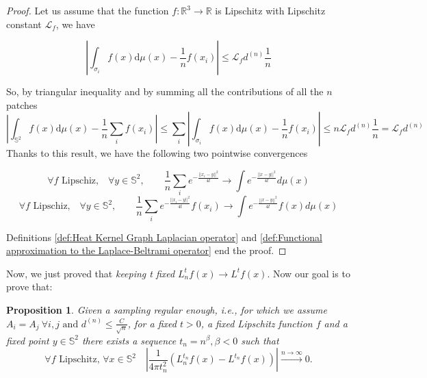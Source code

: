 \documentclass{article} %
\newtheorem{prop}{Proposition}
\begin{document}
\begin{proof}

	Let us assume that the function $f:\mathbb R^3\rightarrow \mathbb R$ is Lipschitz with Lipschitz constant $\mathcal L_f$, we have

	$$\left| \int_{\sigma_{i}}f({ x})\text{d}{\mu(x)} - \frac{1}{n}f( x_i)\right| \leq \mathcal L_fd^{(n)}\frac{1}{n} $$

	So, by triangular inequality and by summing all the contributions of all the $n$ patches
	$$\left| \int_{\mathbb S^2}f({ x})\text{d}{\mu(x)} - \frac{1}{n}\sum_i f( x_i)\right| \leq \sum_i \left| \int_{\sigma_{i}}f({ x})\text{d}{\mu(x)} - \frac{1}{n}f( x_i)\right|\leq n  \mathcal L_fd^{(n)}\frac{1}{n} = \mathcal L_fd^{(n)}$$
	Thanks to this result, we have the following two pointwise convergences

	$$\forall f \text{ Lipschiz,}\quad \forall y\in\mathbb S^2,  \quad\quad \frac{1}{n}\sum_i e^{-\frac{||x_i-y||^2}{4t}}\rightarrow \int e^{-\frac{||x-y||^2}{4t}}d\mu(x)$$
	$$\forall f \text{ Lipschiz,}\quad \forall y\in\mathbb S^2,  \quad\quad \frac{1}{n}\sum_i e^{-\frac{||x_i-y||^2}{4t}}f(x_i)\rightarrow \int e^{-\frac{||x-y||^2}{4t}}f(x)d\mu(x)$$

	Definitions \ref{def:Heat Kernel Graph Laplacian operator} and \ref{def:Functional approximation to the Laplace-Beltrami operator} end the proof.
\end{proof}
\vspace{0.5cm}

Now, we just proved that \textit{keeping t fixed} $L_n^tf(x)\rightarrow L^tf(x)$. Now our goal is to prove that:

\vspace{0.5cm}
\begin{prop}\label{prop:2}
	Given a sampling regular enough, i.e., for which we assume $A_i=A_j \ \forall i,j\text{ and }d^{(n)}\leq \frac{C}{\sqrt{n}}$, for a fixed $t>0$, a fixed Lipschitz function $f$ and a fixed point $y\in\mathbb S^2$ there exists a sequence $t_n = n^\beta, \beta<0$ such that
$$
\forall f \text{ Lipschitz, } \forall x\in\mathbb S^2 \quad \left|\frac{1}{4\pi t_n^2}\left(L_n^{t_n}f(x) - L^{t_n}f(x)\right)\right|\xrightarrow{n\to \infty}0.
$$
\end{prop}
\vspace{0.5cm}
\end{document}
